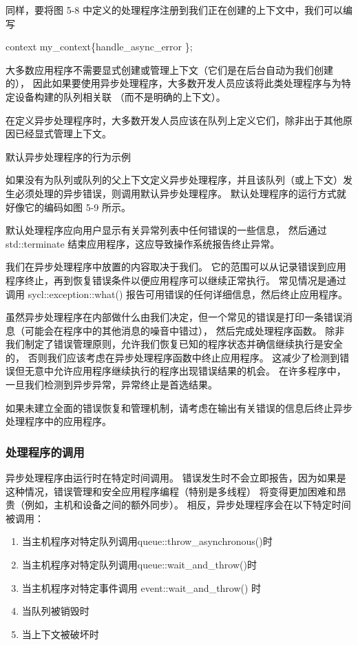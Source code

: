 同样，要将图 5-8 中定义的处理程序注册到我们正在创建的上下文中，我们可以编写

context my\_context\{handle\_async\_error \};

大多数应用程序不需要显式创建或管理上下文（它们是在后台自动为我们创建的），
因此如果要使用异步处理程序，大多数开发人员应该将此类处理程序与为特定设备构建的队列相关联 （而不是明确的上下文）。

\begin{remark}
	在定义异步处理程序时，大多数开发人员应该在队列上定义它们，除非出于其他原因已经显式管理上下文。
\end{remark}

{\color{red} 默认异步处理程序的行为示例}

如果没有为队列或队列的父上下文定义异步处理程序，并且该队列（或上下文）发生必须处理的异步错误，则调用默认异步处理程序。 
默认处理程序的运行方式就好像它的编码如图 5-9 所示。

默认处理程序应向用户显示有关异常列表中任何错误的一些信息，
然后通过 std::terminate 结束应用程序，这应导致操作系统报告终止异常。

我们在异步处理程序中放置的内容取决于我们。 
它的范围可以从记录错误到应用程序终止，再到恢复错误条件以便应用程序可以继续正常执行。 
常见情况是通过调用 sycl::exception::what() 报告可用错误的任何详细信息，然后终止应用程序。

虽然异步处理程序在内部做什么由我们决定，但一个常见的错误是打印一条错误消息（可能会在程序中的其他消息的噪音中错过），
然后完成处理程序函数。 除非我们制定了错误管理原则，允许我们恢复已知的程序状态并确信继续执行是安全的，
否则我们应该考虑在异步处理程序函数中终止应用程序。 
这减少了检测到错误但无意中允许应用程序继续执行的程序出现错误结果的机会。 
在许多程序中，一旦我们检测到异步异常，异常终止是首选结果。

\begin{remark}
	如果未建立全面的错误恢复和管理机制，请考虑在输出有关错误的信息后终止异步处理程序中的应用程序。
\end{remark}

\subsubsection{处理程序的调用}
异步处理程序由运行时在特定时间调用。 
错误发生时不会立即报告，因为如果是这种情况，错误管理和安全应用程序编程（特别是多线程）
将变得更加困难和昂贵（例如，主机和设备之间的额外同步）。 相反，异步处理程序会在以下特定时间被调用：

\begin{enumerate}
	\item 当主机程序对特定队列调用queue::throw\_asynchronous()时

	\item 当主机程序对特定队列调用queue::wait\_and\_throw()时

	\item 当主机程序对特定事件调用 event::wait\_and\_throw() 时

	\item 当队列被销毁时

	\item 当上下文被破坏时
\end{enumerate}

